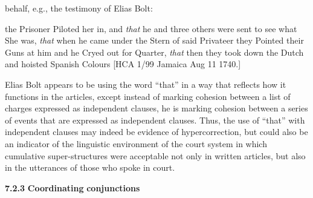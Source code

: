 behalf, e.g., the testimony of Elias Bolt:

the Prisoner Piloted her in, and \textit{that} he and three others were sent to see what She was, \textit{that} when he came under the Stern of said Privateer they Pointed their Guns at him and he Cryed out for Quarter, \textit{that} then they took down the Dutch and hoisted Spanish Colours [HCA 1/99 Jamaica Aug 11 1740.]

Elias Bolt appears to be using the word “that” in a way that reflects how it functions in the articles, except instead of marking cohesion between a list of charges expressed as independent clauses, he is marking cohesion between a series of events that are expressed as independent clauses. Thus, the use of “that” with independent clauses may indeed be evidence of hypercorrection, but could also be an indicator of the linguistic environment of the court system in which cumulative super-structures were acceptable not only in written articles, but also in the utterances of those who spoke in court. 

  \textbf{7.2.3} \textbf{Coordinating} \textbf{conjunctions} 

